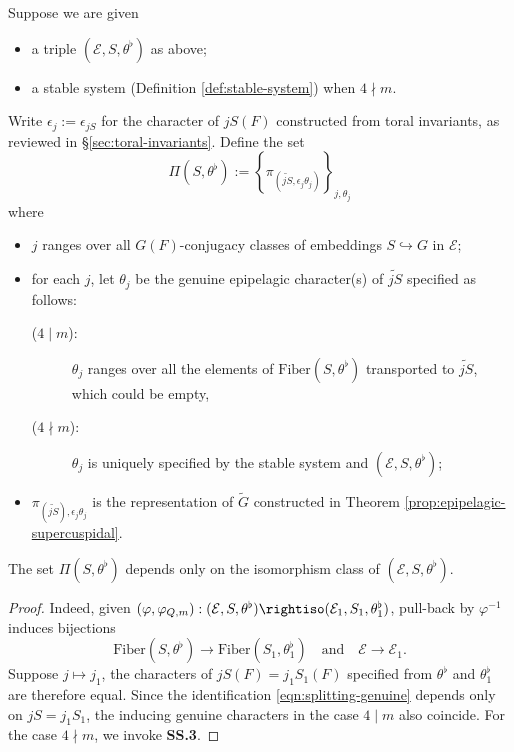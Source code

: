 \documentclass[a4paper,10pt]{article}
\begin{document}
\begin{definition}\label{def:packet-0}
	Suppose we are given
	\begin{itemize}
		\item a triple $(\mathcal{E}, S, \theta^\flat)$ as above;
		\item a stable system (Definition \ref{def:stable-system}) when $4 \nmid m$.
	\end{itemize}
	Write $\epsilon_j := \epsilon_{jS}$ for the character of $jS(F)$ constructed from toral invariants, as reviewed in \S\ref{sec:toral-invariants}. Define the set
	\[ \Pi(S, \theta^\flat) := \left\{ \pi_{(\widetilde{jS}, \epsilon_j \theta_j)} \right\}_{j, \theta_j} \]
	where
	\begin{itemize}
		\item $j$ ranges over all $G(F)$-conjugacy classes of embeddings $S \hookrightarrow G$ in $\mathcal{E}$;
		\item for each $j$, let $\theta_j$ be the genuine epipelagic character(s) of $\widetilde{jS}$ specified as follows:
		\begin{description}
			\item[($4 \mid m$):] $\theta_j$ ranges over all the elements of $\text{Fiber}(S, \theta^\flat)$ transported to $\widetilde{jS}$, which could be empty,
			\item[($4 \nmid m$):] $\theta_j$ is uniquely specified by the stable system and $(\mathcal{E}, S, \theta^\flat)$;
		\end{description}
	\item $\pi_{(\widetilde{jS}), \epsilon_j \theta_j}$ is the representation of $\tilde{G}$ constructed in Theorem \ref{prop:epipelagic-supercuspidal}.
	\end{itemize}
\end{definition}

\begin{lemma}
	The set $\Pi(S, \theta^\flat)$ depends only on the isomorphism class of $(\mathcal{E}, S, \theta^\flat)$.
\end{lemma}
\begin{proof}
	Indeed, given $(\varphi, \varphi_{Q,m}): (\mathcal{E}, S, \theta^\flat) \rightiso (\mathcal{E}_1, S_1, \theta^\flat_1)$, pull-back by $\varphi^{-1}$ induces bijections
	\[ \text{Fiber}(S, \theta^\flat) \to \text{Fiber}(S_1, \theta^\flat_1) \quad \text{and} \quad \mathcal{E} \to \mathcal{E}_1. \]
	Suppose $j \mapsto j_1$, the characters of $jS(F) = j_1 S_1(F)$ specified from $\theta^\flat$ and $\theta^\flat_1$ are therefore equal. Since the identification \eqref{eqn:splitting-genuine} depends only on $jS = j_1 S_1$, the inducing genuine characters in the case $4 \mid m$ also coincide. For the case $4 \nmid m$, we invoke \textbf{SS.3}.
\end{proof}
\end{document}
